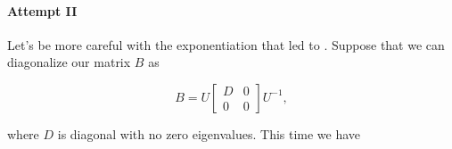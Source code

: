 %
%

\paragraph{Attempt II}

Let's be more careful with the exponentiation that led to .  Suppose that we can diagonalize our matrix \(B\) as

\begin{dmath}\label{eqn:threeSpringLoopattemptII:600}
B = 
U 
\begin{bmatrix}
D & 0 \\
0 & 0
\end{bmatrix}
U^{-1},
\end{dmath}

where \(D\) is diagonal with no zero eigenvalues.  This time we have

